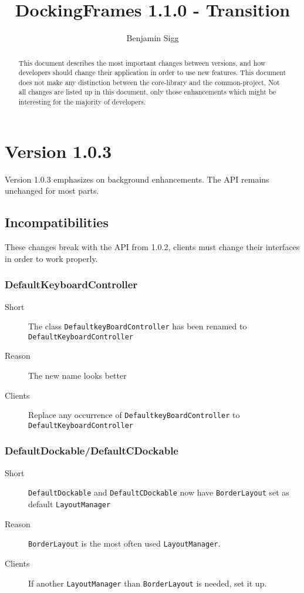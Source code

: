 \documentclass[a4paper,10pt]{article}
\title{DockingFrames 1.1.0 - Transition}
\author{Benjamin Sigg}
\newcommand{\src}[1]{\lstinline[basicstyle=\normalsize\ttfamily,keywordstyle=\normalsize\ttfamily,identifierstyle=\normalsize\ttfamily]|#1|}
\newcommand{\short}{\item[Short]}
\newcommand{\why}{\item[Reason]}
\newcommand{\clients}{\item[Clients]}
\begin{document}
\maketitle
\tableofcontents
\newpage


\begin{abstract}
This document describes the most important changes between versions, and how developers should change their application in order to use new features. This document does not make any distinction between the core-library and the common-project. Not all changes are listed up in this document, only those enhancements which might be interesting for the majority of developers.
\end{abstract}

\section{Version 1.0.3}
Version 1.0.3 emphasizes on background enhancements. The API remains unchanged for most parts.
\subsection{Incompatibilities}
These changes break with the API from 1.0.2, clients must change their interfaces in order to work properly.

\subsubsection{DefaultKeyboardController}
\begin{description}
\short The class \src{DefaultkeyBoardController} has been renamed to \\\src{DefaultKeyboardController} 
\why The new name looks better
\clients Replace any occurrence of \src{DefaultkeyBoardController} to \\\src{DefaultKeyboardController}
\end{description}

\subsubsection{DefaultDockable/DefaultCDockable}
\begin{description}
 \short \src{DefaultDockable} and \src{DefaultCDockable} now have \src{BorderLayout} set as default \src{LayoutManager}
 \why \src{BorderLayout} is the most often used \src{LayoutManager}.
 \clients If another \src{LayoutManager} than \src{BorderLayout} is needed, set it up.
\end{description}
\end{document}
